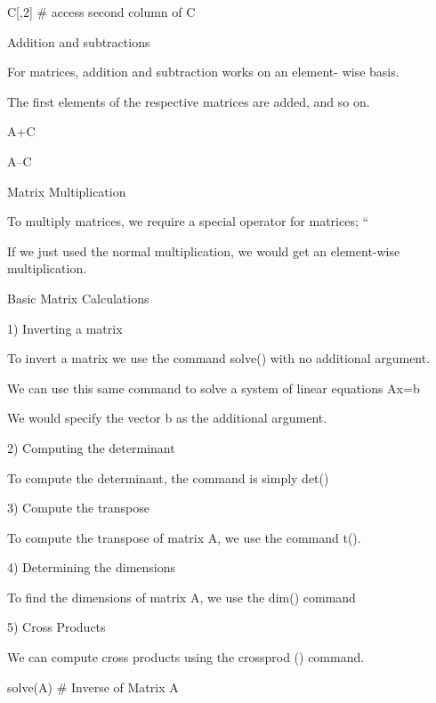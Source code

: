 C[,2]   # access second column of C
 





Addition and subtractions


For matrices, addition and subtraction works on an element- wise basis. 

The first elements of the respective matrices are added, and so on.










A+C                                             


A–C
 





Matrix Multiplication


To multiply matrices, we require a special operator for matrices; “%


If we just used the normal multiplication, we would get an element-wise multiplication.


Basic Matrix Calculations


1) Inverting a matrix 


To invert a matrix we use the command solve() with no additional argument.


We can use this same command to solve a system of linear equations Ax=b

We would specify the vector b as the additional argument.



2) Computing the determinant


To compute the determinant, the command is simply det()



3) Compute the transpose 


To compute the transpose of matrix A, we use the command t().



4) Determining the dimensions 


To find the dimensions of matrix A, we use the dim() command


5) Cross Products


We can compute cross products using the crossprod () command. 









solve(A)                            # Inverse of Matrix A    


